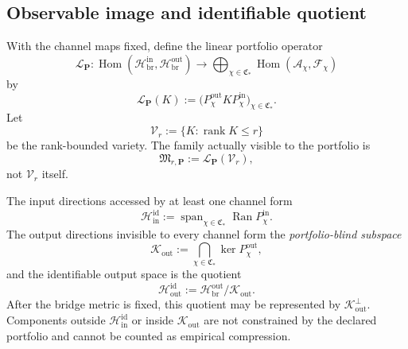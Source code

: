 \documentclass[11pt]{article}
\newcommand{\Kout}{\mathcal{K}_{\mathrm{out}}}
\begin{document}
\subsection{Observable image and identifiable quotient}

With the channel maps fixed, define the linear portfolio operator
\begin{equation}
\mathcal L_{\mathbf P}:
\operatorname{Hom}
(\mathcal H_{\mathrm{br}}^{\mathrm{in}},
 \mathcal H_{\mathrm{br}}^{\mathrm{out}})
\longrightarrow
\bigoplus_{\chi\in\mathfrak C_*}
\operatorname{Hom}(\mathcal A_{\chi},\mathcal F_{\chi})
\end{equation}
by
\begin{equation}
\mathcal L_{\mathbf P}(K)
:=
\bigl(P_{\chi}^{\mathrm{out}}KP_{\chi}^{\mathrm{in}}\bigr)_{\chi\in\mathfrak C_*}.
\label{eq:portfolio_operator}
\end{equation}
Let
\begin{equation}
\mathcal V_r
:=\{K:\operatorname{rank}K\le r\}
\end{equation}
be the rank-bounded variety. The family actually visible to the portfolio is
\begin{equation}
\mathfrak M_{r,\mathbf P}
:=\mathcal L_{\mathbf P}(\mathcal V_r),
\label{eq:visible_model_family}
\end{equation}
not \(\mathcal V_r\) itself.

The input directions accessed by at least one channel form
\begin{equation}
\mathcal H_{\mathrm{in}}^{\mathrm{id}}
:=\operatorname{span}_{\chi\in\mathfrak C_*}
\operatorname{Ran}P_{\chi}^{\mathrm{in}}.
\end{equation}
The output directions invisible to every channel form the \emph{portfolio-blind subspace}
\begin{equation}
\Kout
:=\bigcap_{\chi\in\mathfrak C_*}
\ker P_{\chi}^{\mathrm{out}},
\end{equation}
and the identifiable output space is the quotient
\begin{equation}
\mathcal H_{\mathrm{out}}^{\mathrm{id}}
:=\mathcal H_{\mathrm{br}}^{\mathrm{out}}/
\Kout.
\label{eq:identifiable_quotient}
\end{equation}
After the bridge metric is fixed, this quotient may be represented by \(\Kout^{\perp}\). Components outside \(\mathcal H_{\mathrm{in}}^{\mathrm{id}}\) or inside \(\Kout\) are not constrained by the declared portfolio and cannot be counted as empirical compression.
\end{document}
